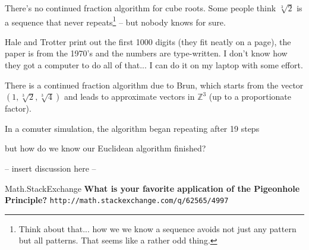 \documentclass[12pt]{article}
\begin{document}
\noindent There's no continued fraction algorithm for cube roots.  Some people think $\sqrt[3]{2}$ is a sequence that never repeats\footnote{Think about that... how we we know a sequence avoids not just any pattern but all patterns.  That seems like a rather odd thing.} -- but nobody knows for sure. \newline

\noindent Hale and Trotter print out the first 1000 digits (they fit neatly on a page), the paper is from the 1970's and the numbers are type-written.  I don't know how they got a computer to do all of that... I can do it on my laptop with some effort. \newline

\noindent There is a continued fraction algorithm due to Brun, which starts from the vector $(1, \sqrt[3]{2}, \sqrt[3]{4})$ and leads to approximate vectors in $\mathbb{Z}^3$ (up to a proportionate factor).  \newline 

\noindent In a comuter simulation, the algorithm began repeating after 19 steps \newpage

\noindent but how do we know our Euclidean algorithm finished? \newline

\noindent -- insert discussion here -- 

\newpage

\selectfont \fontsize{12}{10}\selectfont

\begin{thebibliography}{}

\item Math.StackExchange \textbf{What is your favorite application of the Pigeonhole Principle?} \texttt{http://math.stackexchange.com/q/62565/4997}



\end{thebibliography}
\end{document}
